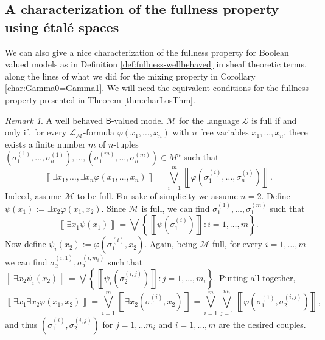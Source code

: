 \documentclass[11pt]{amsart}
\newcommand{\nphi}{\varphi}
\newcommand{\LL}{\mathcal{L}}
\theoremstyle{plain}
\theoremstyle{definition}
\theoremstyle{plain}
\theoremstyle{remark}
\newtheorem{remark}[theorem]{Remark}
\newcommand{\M}{\mathcal{M}}
\newcommand{\bool}[1]{\mathsf{#1}}
\newcommand{\cp}[1]{\left( #1 \right)}
\newcommand{\Qp}[1]{\left\llbracket #1 \right\rrbracket}
\newcommand{\bp}[1]{\left\lbrace #1 \right\rbrace}
\newcommand{\0}{\mathsf{0}}
\renewcommand{\1}{\mathsf{1}}
\renewcommand{\2}{\mathsf{2}}
\theoremstyle{definition}
\begin{document}
\subsection{A characterization of the fullness property using \'etal\'e spaces}
\label{sec:charfulletalespace}



We can also give a nice characterization of the fullness property for Boolean valued models as in Definition \ref{def:fullness-wellbehaved} in sheaf theoretic terms, along the lines of what we did for the mixing property in Corollary \ref{char:Gamma0=Gamma1}. We will need the equivalent conditions for the fullness property presented in Theorem \ref{thm:charLosThm}.
\begin{remark}A well behaved $\bool{B}$-valued model $\M$ for the language $\LL$ is full if and only if, 
for every $\LL_\M$-formula $\nphi(x_1, \dots, x_n)$ with $n$ free variables $x_1, \dots, x_n$, there exists a finite number $m$ of $n$-tuples 
$\cp{\sigma_1^{(1)}, \dots, \sigma_n^{(1)}}, \dots, \cp{\sigma_1^{(m)}, \dots, \sigma_n^{(m)}}\in M^n$ such that
\[
\Qp{\exists x_1, \dots, \exists x_n\nphi(x_1, \dots, x_n)}=\bigvee_{i=1}^m\Qp{\nphi\cp{\sigma_1^{(i)}, \dots, \sigma_n^{(i)}}}.
\]
Indeed, assume $\M$ to be full. For sake of simplicity we assume $n=2$. Define $\psi(x_1):=\exists x_2\nphi(x_1, x_2)$. Since $\M$ is full, we can find $\sigma^{(1)}_1, \dots, \sigma_1^{(m)}$ such that 
\[
\Qp{\exists x_1\psi(x_1)}=\bigvee\bp{\Qp{\psi\cp{\sigma_1^{(i)}}}: i=1, \dots, m}.
\] 
Now define $\psi_i(x_2):=\nphi\cp{\sigma_1^{(i)}, x_2}$. Again, being $\M$ full, for every $i=1, \dots, m$ we can find $\sigma_2^{(i, 1)}, \sigma_2^{(i, m_i)}$ such that $\Qp{\exists x_2\psi_i(x_2)}=\bigvee\bp{\Qp{\psi_i\cp{\sigma_2^{(i, j)}}}: j=1, \dots, m_i}$. Putting all together,
\[
\Qp{\exists x_1\exists x_2\nphi(x_1, x_2)}=\bigvee_{i=1}^m\Qp{\exists x_2\cp{\sigma_1^{(i)}, x_2}}=\bigvee_{i=1}^m\bigvee_{j=1}^{m_i}\Qp{\nphi\cp{\sigma_1^{(1)}, \sigma_2^{(i, j)}}},
\]
and thus $\cp{\sigma_1^{(i)}, \sigma_2^{(i, j)}}$ for $j=1, \dots m_i$ and $i=1, \dots, m$ are the desired couples.

\end{remark}
\end{document}
